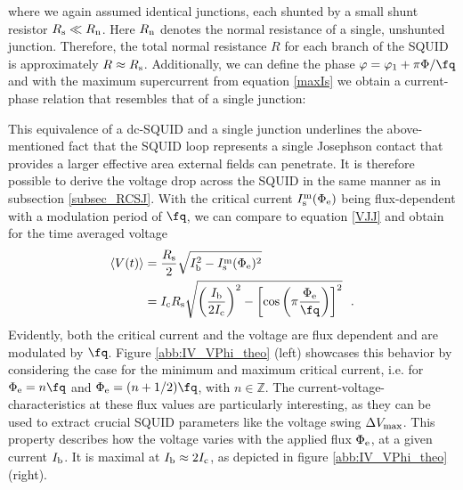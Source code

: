 
where we again assumed identical junctions, each shunted by a small shunt resistor $R_{\rm s}\ll R_{\rm n}$. Here $R_{\rm n}$ denotes the normal resistance of a single, unshunted junction. Therefore, the total normal resistance $R$ for each branch of the SQUID is approximately $R\approx R_{\rm s}$. Additionally, we can define the phase $\varphi=\varphi_1 + \pi\Phi/\unit{\fq}$ and with the maximum supercurrent from equation \ref{maxIs} we obtain a current-phase relation that resembles that of a single junction:


This equivalence of a dc-SQUID and a single junction underlines the above-mentioned fact that the SQUID loop represents a single Josephson contact that provides a larger effective area external fields can penetrate. It is therefore possible to derive the voltage drop across the SQUID in the same manner as in subsection \ref{subsec_RCSJ}. With the critical current $I_{\rm s}^{\rm m}(\Phi_{\rm e})$ being flux-dependent with a modulation period of $\unit{\fq}$, we can compare to equation \ref{VJJ} and obtain for the time averaged voltage \cite{Clarke2004}
\begin{align}\label{squidV(t)}
	\langle V(t)\rangle &= \frac{R_{\rm s}}{2}\sqrt{I_{\rm b}^2 - I_{\rm s}^{\rm m}(\Phi_{\rm e})^2} \\ &= I_{\rm c}R_{\rm s}\sqrt{\left(\frac{I_{\rm b}}{2I_{\rm c}}\right)^2-\left[\cos\left(\pi\frac{\Phi_{\rm e}}{\unit{\fq}}\right)\right]^2} \ \ .	
\end{align}     
Evidently, both the critical current and the voltage are flux dependent and are modulated by $\unit{\fq}$. Figure \ref{abb:IV_VPhi_theo} (left) showcases this behavior by considering the case for the minimum and maximum critical current, i.e. for $\Phi_{\rm e} = n\unit{\fq}$ and $\Phi_{\rm e} = (n+1/2)\unit{\fq}$, with $n\in\mathbb{Z}$. The current-voltage-characteristics at these flux values are particularly interesting, as they can be used to extract crucial SQUID parameters like the voltage swing $\Delta V_{\rm max}$. This property describes how the voltage varies with the applied flux $\Phi_{\rm e}$, at a given current $I_{\rm b}$. It is maximal at $I_{\rm b}\approx 2I_{\rm c}$, as depicted in figure \ref{abb:IV_VPhi_theo} (right). \\

